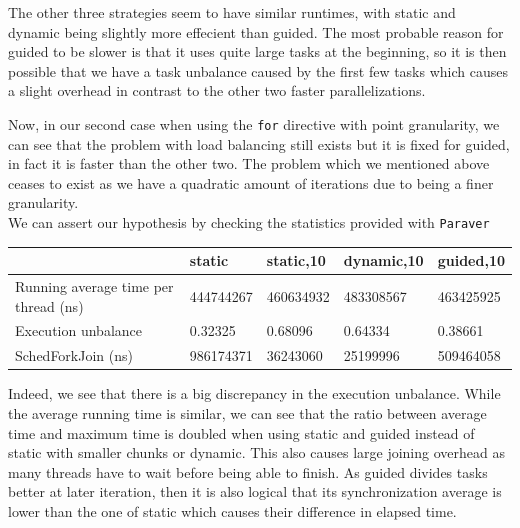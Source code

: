 \documentclass[11pt]{article}
\begin{document}
The other three strategies seem to have similar runtimes, with static and dynamic being slightly more effecient than guided. The most probable reason for guided to be slower is that it uses quite large tasks at the beginning, so it is then possible that we have a task unbalance caused by the first few tasks which causes a slight overhead in contrast to the other two faster parallelizations. 

Now, in our second case when using the \texttt{for} directive with point granularity, we can see that the problem with load balancing still exists but it is fixed for guided, in fact it is faster than the other two. The problem which we mentioned above ceases to exist as we have a quadratic amount of iterations due to being a finer granularity.\\

We can assert our hypothesis by checking the statistics provided with \texttt{Paraver}

\begin{center}
  \begin{tabular}{|l|l|l|l|l|}
    \hline
    & static & static,10 & dynamic,10 & guided,10\\
    \hline
    Running average time per thread (ns) & 444744267  & 460634932  & 483308567 & 463425925\\
    \hline
    Execution unbalance & 0.32325 & 0.68096 & 0.64334 & 0.38661 \\
    \hline
    SchedForkJoin (ns) & 986174371 & 36243060 & 25199996 & 509464058 \\
    \hline
  \end{tabular}
\end{center}

Indeed, we see that there is a big discrepancy in the execution unbalance. While the average running time is similar, we can see that the ratio between average time and maximum time is doubled when using static and guided instead of static with smaller chunks or dynamic. This also causes large joining overhead as many threads have to wait before being able to finish. As guided divides tasks better at later iteration, then it is also logical that its synchronization average is lower than the one of static which causes their difference in elapsed time.
\end{document}
